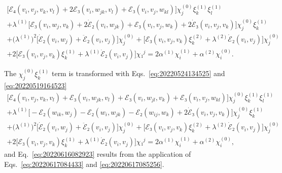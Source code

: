 \documentclass[12pt, final]{scrartcl}
\theoremstyle{definition}
\newcommand{\order}[2][1]{#2^{(#1)}}
\begin{document}
\begin{multline*}
  \bigl[ ℰ₄(v_i, v_j,  v_k, v_l) + 2ℰ₃(v_i, w_{jk}, v_l) + ℰ₃(v_i, v_j, w_{kl})\bigr] \order[0]{χ_j} \order[1]{ξ_k} \order[1]{ξ_l}\\
  + \order[1]λ \bigl[ ℰ₃(v_i,  w_j, v_k) + 2 \dot{ℰ}₂(v_i, w_{jk}) + ℰ₃(v_i, v_j, w_k) + 2 \dot{ℰ}₃(v_i, v_j,  v_k) \bigr] \order[0]{χ_j} \order[1]{ξ_k}\\
  + \bigl( \order[1]λ \bigr)^2 \bigl[\dot{ℰ}₂(v_i, w_j) + \ddot{ℰ}₂(v_i, v_j)\bigr] \order[0]{χ_j} + \bigl[ℰ₃(v_i, v_j, v_k) \order[2]{ξ_k} + \order[2]λ \dot{ℰ}₂(v_i, v_j)\bigr] \order[0]{χ_j} \\
  +2\bigl[ℰ₃(v_i, v_j,  v_k)  \order[1]{ξ_k} + \order[1]λ \dot{ℰ}₂(v_i, v_j)\bigr] χ₁^j = 2\order[1]α\order[1]{χ_i} + \order[2]α \order[0]{χ_i}.
\end{multline*}

The \(\order[0]{χ_j} \order[1]{ξ_k}\) term is transformed with Eqs.~\eqref{eq:20220524134525} and
\eqref{eq:20220519164523}
\begin{multline*}
  \bigl[ ℰ₄(v_i, v_j,  v_k, v_l) + ℰ₃(v_i, w_{jk}, v_l) + ℰ₃(v_i, w_{jl}, v_k) + ℰ₃(v_i, v_j, w_{kl})\bigr] \order[0]{χ_j} \order[1]{ξ_k} \order[1]{ξ_l}\\
  + \order[1]λ \bigl[ -ℰ₂(w_{ik},  w_j) - ℰ₂(w_i, w_{jk}) - ℰ₂(w_{ij}, w_k) + 2 \dot{ℰ}₃(v_i, v_j,  v_k) \bigr] \order[0]{χ_j} \order[1]{ξ_k}\\
  + \bigl( \order[1]λ \bigr)^2 \bigl[\dot{ℰ}₂(v_i, w_j) + \ddot{ℰ}₂(v_i, v_j)\bigr] \order[0]{χ_j} + \bigl[ℰ₃(v_i, v_j, v_k) \order[2]{ξ_k} + \order[2]λ \dot{ℰ}₂(v_i, v_j)\bigr] \order[0]{χ_j} \\
  +2\bigl[ℰ₃(v_i, v_j,  v_k)  \order[1]{ξ_k} + \order[1]λ \dot{ℰ}₂(v_i, v_j)\bigr] χ₁^j = 2\order[1]α\order[1]{χ_i} + \order[2]α \order[0]{χ_i},
\end{multline*}
and Eq.~\eqref{eq:20220616082923} results from the application of
Eqs.~\eqref{eq:20220617084433} and \eqref{eq:20220617085256}.
\end{document}
